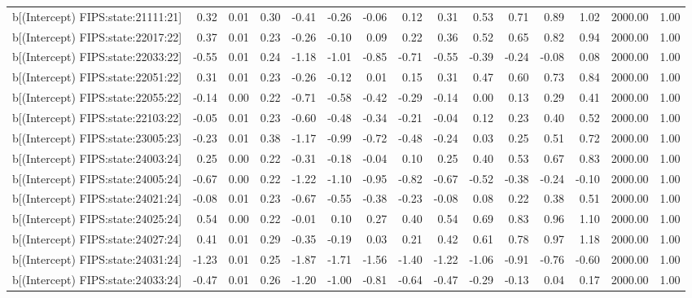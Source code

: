 \begin{table}[ht]
\begin{tabular}{rrrrrrrrrrrrrrr}
  b[(Intercept) FIPS:state:21111:21] & 0.32 & 0.01 & 0.30 & -0.41 & -0.26 & -0.06 & 0.12 & 0.31 & 0.53 & 0.71 & 0.89 & 1.02 & 2000.00 & 1.00 \\ 
  b[(Intercept) FIPS:state:22017:22] & 0.37 & 0.01 & 0.23 & -0.26 & -0.10 & 0.09 & 0.22 & 0.36 & 0.52 & 0.65 & 0.82 & 0.94 & 2000.00 & 1.00 \\ 
  b[(Intercept) FIPS:state:22033:22] & -0.55 & 0.01 & 0.24 & -1.18 & -1.01 & -0.85 & -0.71 & -0.55 & -0.39 & -0.24 & -0.08 & 0.08 & 2000.00 & 1.00 \\ 
  b[(Intercept) FIPS:state:22051:22] & 0.31 & 0.01 & 0.23 & -0.26 & -0.12 & 0.01 & 0.15 & 0.31 & 0.47 & 0.60 & 0.73 & 0.84 & 2000.00 & 1.00 \\ 
  b[(Intercept) FIPS:state:22055:22] & -0.14 & 0.00 & 0.22 & -0.71 & -0.58 & -0.42 & -0.29 & -0.14 & 0.00 & 0.13 & 0.29 & 0.41 & 2000.00 & 1.00 \\ 
  b[(Intercept) FIPS:state:22103:22] & -0.05 & 0.01 & 0.23 & -0.60 & -0.48 & -0.34 & -0.21 & -0.04 & 0.12 & 0.23 & 0.40 & 0.52 & 2000.00 & 1.00 \\ 
  b[(Intercept) FIPS:state:23005:23] & -0.23 & 0.01 & 0.38 & -1.17 & -0.99 & -0.72 & -0.48 & -0.24 & 0.03 & 0.25 & 0.51 & 0.72 & 2000.00 & 1.00 \\ 
  b[(Intercept) FIPS:state:24003:24] & 0.25 & 0.00 & 0.22 & -0.31 & -0.18 & -0.04 & 0.10 & 0.25 & 0.40 & 0.53 & 0.67 & 0.83 & 2000.00 & 1.00 \\ 
  b[(Intercept) FIPS:state:24005:24] & -0.67 & 0.00 & 0.22 & -1.22 & -1.10 & -0.95 & -0.82 & -0.67 & -0.52 & -0.38 & -0.24 & -0.10 & 2000.00 & 1.00 \\ 
  b[(Intercept) FIPS:state:24021:24] & -0.08 & 0.01 & 0.23 & -0.67 & -0.55 & -0.38 & -0.23 & -0.08 & 0.08 & 0.22 & 0.38 & 0.51 & 2000.00 & 1.00 \\ 
  b[(Intercept) FIPS:state:24025:24] & 0.54 & 0.00 & 0.22 & -0.01 & 0.10 & 0.27 & 0.40 & 0.54 & 0.69 & 0.83 & 0.96 & 1.10 & 2000.00 & 1.00 \\ 
  b[(Intercept) FIPS:state:24027:24] & 0.41 & 0.01 & 0.29 & -0.35 & -0.19 & 0.03 & 0.21 & 0.42 & 0.61 & 0.78 & 0.97 & 1.18 & 2000.00 & 1.00 \\ 
  b[(Intercept) FIPS:state:24031:24] & -1.23 & 0.01 & 0.25 & -1.87 & -1.71 & -1.56 & -1.40 & -1.22 & -1.06 & -0.91 & -0.76 & -0.60 & 2000.00 & 1.00 \\ 
  b[(Intercept) FIPS:state:24033:24] & -0.47 & 0.01 & 0.26 & -1.20 & -1.00 & -0.81 & -0.64 & -0.47 & -0.29 & -0.13 & 0.04 & 0.17 & 2000.00 & 1.00 \\ 

\end{tabular}
\end{table}

